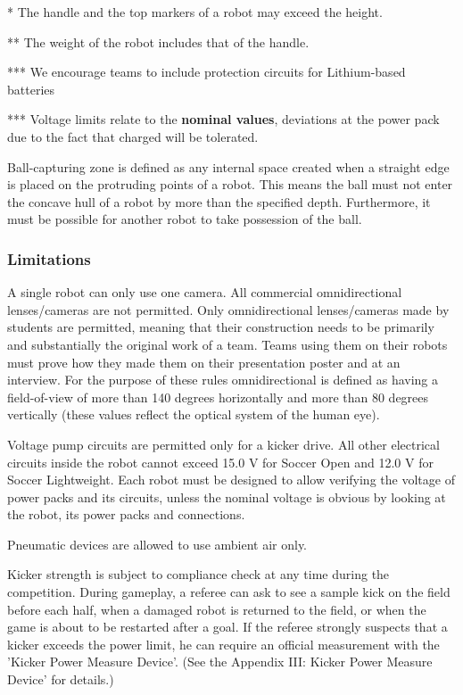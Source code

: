 \documentclass{article}
\begin{document}
* The handle and the top markers of a robot may exceed the height.

** The weight of the robot includes that of the handle.

*** We encourage teams to include protection circuits for Lithium-based
batteries

*** Voltage limits relate to the \textbf{nominal values}, deviations at the power pack
due to the fact that charged will be tolerated.

Ball-capturing zone is defined as any internal space created when a straight
edge is placed on the protruding points of a robot. This means the ball must
not enter the concave hull of a robot by more than the specified depth.
Furthermore, it must be possible for another robot to take possession of the
ball.

\subsubsection{Limitations\label{ref-056}}

A single robot can only use one camera. All commercial omnidirectional
lenses/cameras are not permitted. Only omnidirectional lenses/cameras made by
students are permitted, meaning that their construction needs to be primarily
and substantially the original work of a team. Teams using them on their robots
must prove how they made them on their presentation poster and at an interview.
For the purpose of these rules omnidirectional is defined as having a
field-of-view of more than 140 degrees horizontally and more than 80 degrees
vertically (these values reflect the optical system of the human eye).

Voltage pump circuits are permitted only for a kicker drive. All other
electrical circuits inside the robot cannot exceed 15.0 V for Soccer Open and
12.0 V for Soccer Lightweight. Each robot must be designed to allow verifying
the voltage of power packs and its circuits, unless the nominal voltage is
obvious by looking at the robot, its power packs and connections.

Pneumatic devices are allowed to use ambient air only.

Kicker strength is subject to compliance check at any time during the
competition. During gameplay, a referee can ask to see a sample kick on the
field before each half, when a damaged robot is returned to the field, or when
the game is about to be restarted after a goal. If the referee strongly
suspects that a kicker exceeds the power limit, he can require an official
measurement with the 'Kicker Power Measure Device'. (See the Appendix III:
Kicker Power Measure Device' for details.)
\end{document}
